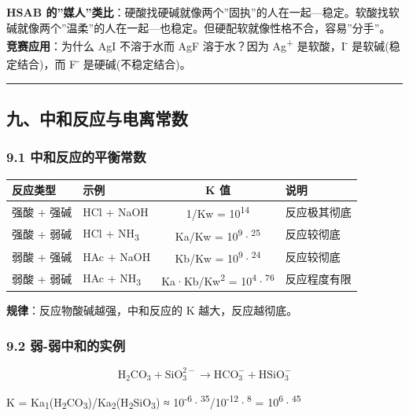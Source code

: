 \documentclass[a4paper,11pt]{ctexart}
\newcounter{none}
\begin{document}
\textbf{HSAB 的''媒人''类比}：硬酸找硬碱就像两个''固执''的人在一起---稳定。软酸找软碱就像两个''温柔''的人在一起---也稳定。但硬配软就像性格不合，容易''分手''。
\textbf{竞赛应用}：为什么 AgI 不溶于水而 AgF 溶于水？因为 Ag\textsuperscript{+} 是软酸，I\textsuperscript{-} 是软碱(稳定结合)，而 F\textsuperscript{-} 是硬碱(不稳定结合)。

\begin{center}\rule{0.5\linewidth}{0.5pt}\end{center}

\subsection{九、中和反应与电离常数}\label{ux4e5dux4e2dux548cux53cdux5e94ux4e0eux7535ux79bbux5e38ux6570}

\subsubsection{9.1 中和反应的平衡常数}\label{ux4e2dux548cux53cdux5e94ux7684ux5e73ux8861ux5e38ux6570}

{\def\LTcaptype{none} %
\begin{longtable}[]{@{}llcl@{}}
\toprule\noalign{}
反应类型 & 示例 & K 值 & 说明 \\
\midrule\noalign{}
\endhead
\bottomrule\noalign{}
\endlastfoot
强酸 + 强碱 & HCl + NaOH & 1/Kw = 10\textsuperscript{14} & 反应极其彻底 \\
强酸 + 弱碱 & HCl + NH\textsubscript{3} & Ka/Kw = 10\textsuperscript{9}·\textsuperscript{25} & 反应较彻底 \\
弱酸 + 强碱 & HAc + NaOH & Kb/Kw = 10\textsuperscript{9}·\textsuperscript{24} & 反应较彻底 \\
弱酸 + 弱碱 & HAc + NH\textsubscript{3} & Ka·Kb/Kw\textsuperscript{2} = 10\textsuperscript{4}·\textsuperscript{76} & 反应程度有限 \\
\end{longtable}
}

\textbf{规律}：反应物酸碱越强，中和反应的 K 越大，反应越彻底。

\subsubsection{9.2 弱-弱中和的实例}\label{ux5f31-ux5f31ux4e2dux548cux7684ux5b9eux4f8b}

\[
\mathrm{H_2CO_3 + SiO_3^{2-} \to HCO_3^- + HSiO_3^-}
\]

K = Ka\textsubscript{1}(H\textsubscript{2}CO\textsubscript{3})/Ka\textsubscript{2}(H\textsubscript{2}SiO\textsubscript{3}) ≈ 10\textsuperscript{-6}·\textsuperscript{35}/10\textsuperscript{-12}·\textsuperscript{8} = 10\textsuperscript{6}·\textsuperscript{45}
\end{document}

